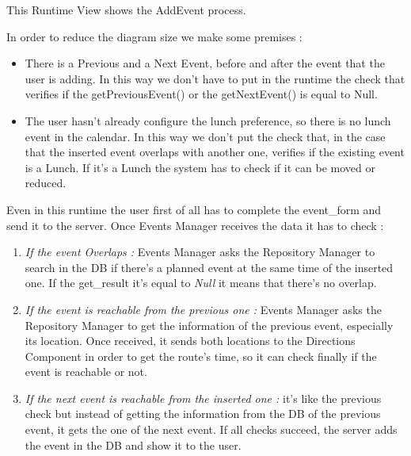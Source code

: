 This Runtime View shows the AddEvent process.\par
In order to reduce the diagram size we make some premises :
\begin{itemize}
	\setlength{\leftskip}{1cm}
	\item There is a Previous and a Next Event, before and after the event that the user is adding. In this way we don’t have to put in the runtime the check that verifies if the getPreviousEvent() or the getNextEvent() is equal to Null.
	\item The user hasn’t already configure the lunch preference, so there is no lunch event in the calendar. In this way we don’t put the check that, in the case that the inserted event overlaps with another one, verifies if the existing event is a Lunch. If it’s a Lunch the system has to check if it can be moved or reduced.
\end{itemize}\par
Even in this runtime the user first of all has to complete the event\_form and send it to the server.
Once Events Manager receives the data it has to check :
\begin{enumerate}
	\setlength{\leftskip}{1cm}
	\item \emph{If the event Overlaps :} Events Manager asks the Repository Manager to search in the DB if there’s a planned event at the same time of the inserted one. If the get\_result it’s equal to \emph{Null} it means that there’s no overlap.
	\item \emph{If the event is reachable from the previous one :} Events Manager asks the Repository Manager to get the information of the previous event, especially its location. Once received, it sends both locations to the Directions Component in order to get the route’s time, so it can check finally if the event is reachable or not.
	\item \emph{If the next event is reachable from the inserted one :} it’s like the previous check but instead of getting the information from the DB of the previous event, it gets the one of the next event.
	If all checks succeed, the server adds the event in the DB and show it to the user.
\end{enumerate}
